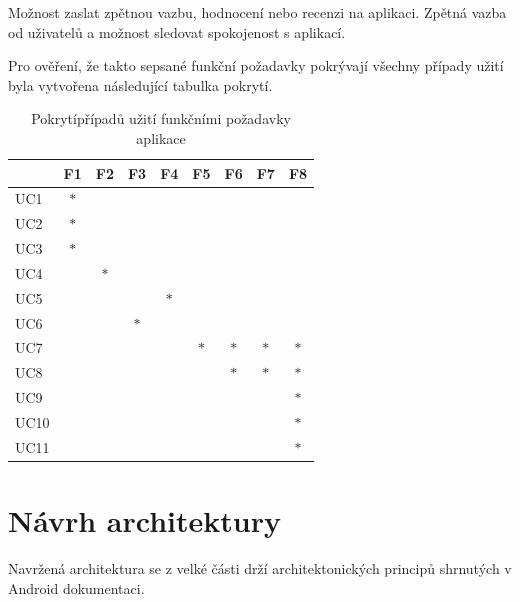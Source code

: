 Možnost zaslat zpětnou vazbu, hodnocení nebo recenzi na aplikaci.
Zpětná vazba od uživatelů a možnost sledovat spokojenost s aplikací.


Pro ověření, že takto sepsané funkční požadavky pokrývají všechny případy užití byla vytvořena následující tabulka pokrytí.

\begin{table}[b]
  \centering
  \begin{tabular}{|l|c|c|c|c|c|c|c|c|}
  \hline
   & F1 & F2 & F3 & F4 & F5 & F6 & F7 & F8  \\ \hline
  UC1  & $\ast$ &        &        &        &        &        &        &         \\ \hline
  UC2  & $\ast$ &        &        &        &        &        &        &         \\ \hline
  UC3  & $\ast$ &        &        &        &        &        &        &         \\ \hline
  UC4  &        & $\ast$ &        &        &        &        &        &         \\ \hline
  UC5  &        &        &        & $\ast$ &        &        &        &         \\ \hline
  UC6  &        &        & $\ast$ &        &        &        &        &         \\ \hline
  UC7  &        &        &        &        & $\ast$ & $\ast$ & $\ast$ & $\ast$  \\ \hline
  UC8  &        &        &        &        &        & $\ast$ & $\ast$ & $\ast$  \\ \hline
  UC9  &        &        &        &        &        &        &        & $\ast$  \\ \hline
  UC10 &        &        &        &        &        &        &        & $\ast$  \\ \hline
  UC11 &        &        &        &        &        &        &        & $\ast$  \\ \hline
  \end{tabular}
  \caption{Pokrytípřípadů užití funkčními požadavky aplikace}
  \label{table:tabulkaPokryti}
\end{table}
  

\section{Návrh architektury}
Navržená architektura se z velké části drží architektonických principů shrnutých v Android dokumentaci. \cite{andDocArch}

